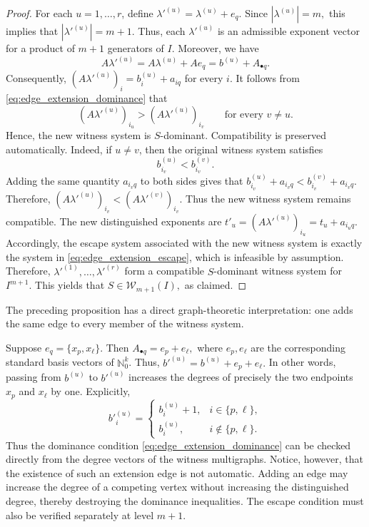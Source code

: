 \documentclass[11pt]{amsart}   %
\begin{document}
\begin{proof}
For each \(u=1,\ldots,r\), define $\lambda'^{(u)}=\lambda^{(u)}+e_q.$ Since
 $|\lambda^{(u)}|=m,$ this implies that  $|\lambda'^{(u)}|=m+1.$ Thus, each \(\lambda'^{(u)}\) is an admissible exponent vector for a
product of \(m+1\) generators of \(I\). Moreover, we have
\[
A\lambda'^{(u)}
=
A\lambda^{(u)}+Ae_q
=
b^{(u)}+A_{\bullet q}.
\]
Consequently, $(A\lambda'^{(u)})_i=b^{(u)}_i+a_{iq}$ for every \(i\). It follows from \eqref{eq:edge_extension_dominance} that
\[
(A\lambda'^{(u)})_{i_u}
>
(A\lambda'^{(u)})_{i_v}
\qquad
\text{for every }v\neq u.
\]
Hence, the new witness system is \(S\)-dominant. Compatibility is preserved automatically. Indeed, if \(u\neq v\), then
the original witness system satisfies
\[
b^{(u)}_{i_v}<b^{(v)}_{i_v}.
\]
Adding the same quantity \(a_{i_vq}\) to both sides gives that $b^{(u)}_{i_v}+a_{i_vq}
<
b^{(v)}_{i_v}+a_{i_vq}.$ Therefore, $(A\lambda'^{(u)})_{i_v}
<
(A\lambda'^{(v)})_{i_v}.$ Thus the new witness system remains compatible. The new distinguished exponents are
 $t'_u=(A\lambda'^{(u)})_{i_u}=t_u+a_{i_uq}.$ Accordingly,  the escape system associated with the new witness system is
exactly the system in \eqref{eq:edge_extension_escape}, which is
infeasible by assumption. Therefore, $\lambda'^{(1)},\ldots,\lambda'^{(r)}$ form a compatible \(S\)-dominant witness system for \(I^{m+1}\).
This yields that  $S\in\mathcal W_{m+1}(I),$ as claimed.
\end{proof}


The preceding proposition has a direct graph-theoretic interpretation:
one adds the same edge to every member of the witness system.

\begin{rem} \label{rem:edge_extension_interpretation}
Suppose  $e_q=\{x_p,x_\ell\}.$ Then $A_{\bullet q}=e_p+e_\ell,$
where \(e_p,e_\ell\) are the corresponding standard basis vectors of
\(\mathbb N_0^k\). Thus, $b'^{(u)}=b^{(u)}+e_p+e_\ell.$
In other words, passing from \(b^{(u)}\) to \(b'^{(u)}\) increases the
degrees of precisely the two endpoints \(x_p\) and \(x_\ell\) by one.
Explicitly,
\[
b'^{(u)}_i
=
\begin{cases}
b^{(u)}_i+1,&i\in\{p,\ell\},\\
b^{(u)}_i,&i\notin\{p,\ell\}.
\end{cases}
\]
Thus the dominance condition
\eqref{eq:edge_extension_dominance} can be checked directly from the
degree vectors of the witness multigraphs.
Notice, however, that the existence of such an extension edge is not
automatic. Adding an edge may increase the degree of a competing
vertex without increasing the distinguished degree, thereby destroying
the dominance inequalities. The escape condition must also be
verified separately at level \(m+1\).
\end{rem}
\end{document}
